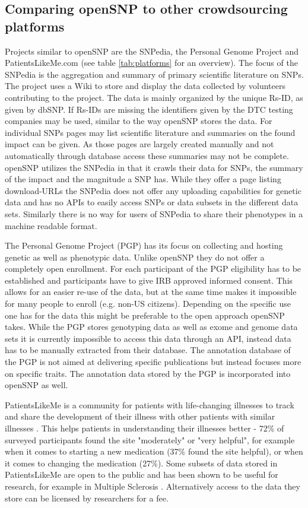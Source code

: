 \documentclass[10pt]{article}
\begin{document}
\subsection*{Comparing openSNP to other crowdsourcing platforms}
Projects similar to openSNP are the SNPedia, the Personal Genome Project and PatientsLikeMe.com (see table \ref{tab:platforms} for an overview). The focus of the SNPedia is the aggregation and summary of primary scientific literature on SNPs. The project uses a Wiki to store and display the data collected by volunteers contributing to the project. The data is mainly organized by the unique Rs-ID, as given by dbSNP. If Rs-IDs are missing the identifiers given by the DTC testing companies may be used, similar to the way openSNP stores the data. For individual SNPs pages may list scientific literature and summaries on the found impact can be given. As those pages are largely created manually and not automatically through database access these summaries may not be complete. openSNP utilizes the SNPedia in that it crawls their data for SNPs, the summary of the impact and the magnitude a SNP has. While they offer a page listing download-URLs the SNPedia does not offer any uploading capabilities for genetic data and has no APIs to easily access SNPs or data subsets in the different data sets. Similarly there is no way for users of SNPedia to share their phenotypes in a machine readable format. 

The Personal Genome Project (PGP) has its focus on collecting and hosting genetic as well as phenotypic data. Unlike openSNP they do not offer a completely open enrollment. For each participant of the PGP eligibility has to be established and participants have to give IRB approved informed consent. This allows for an easier re-use of the data, but at the same time makes it impossible for many people to enroll (e.g. non-US citizens). Depending on the specific use one has for the data this might be preferable to the open approach openSNP takes. While the PGP stores genotyping data as well as exome and genome data sets it is currently impossible to access this data through an API, instead data has to be manually extracted from their database. The annotation database of the PGP is not aimed at delivering specific publications but instead focuses more on specific traits. The annotation data stored by the PGP is incorporated into openSNP as well. 

PatientsLikeMe is a community for patients with life-changing illnesses to track and share the development of their illness with other patients with similar illnesses \cite{Wicks2010}.  This helps patients in understanding their illnesses better - 72\% of surveyed participants found the site "moderately" or "very helpful", for example when it comes to starting a new medication (37\% found the site helpful), or when it comes to changing the medication (27\%). Some subsets of data stored in PatientsLikeMe are open to the public and has been shown to be useful for research, for example in Multiple Sclerosis \cite{Bove2013}. Alternatively access to the data they store can be licensed by researchers for a fee. 
\end{document}
